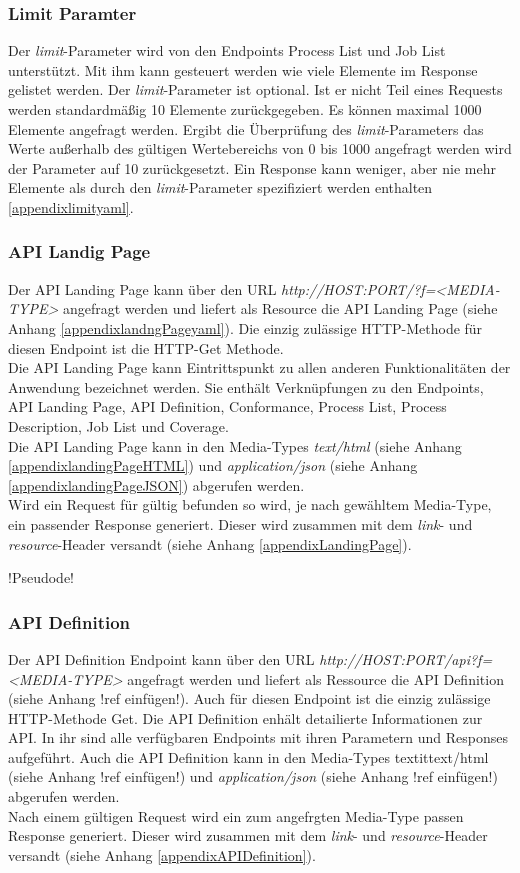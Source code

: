 \subsubsection{Limit Paramter}
Der \textit{limit}-Parameter wird von den Endpoints Process List und Job List unterstützt. Mit ihm kann gesteuert werden wie viele Elemente im Response gelistet werden. 
Der \textit{limit}-Parameter ist optional. Ist er nicht Teil eines Requests werden standardmäßig 10 Elemente zurückgegeben. Es können maximal 1000 Elemente angefragt werden.
Ergibt die Überprüfung des \textit{limit}-Parameters das Werte außerhalb des gültigen Wertebereichs von 0 bis 1000 angefragt werden wird der Parameter auf 10 zurückgesetzt. 
Ein Response kann weniger, aber nie mehr Elemente als durch den \textit{limit}-Parameter spezifiziert werden enthalten \ref{appendixlimityaml}. 

\subsubsection{API Landig Page}
Der API Landing Page kann über den URL \textit{http://HOST:PORT/?f=<MEDIA-TYPE>} angefragt werden und liefert als Resource die 
API Landing Page (siehe Anhang \ref{appendixlandngPageyaml}). 
Die einzig zulässige HTTP-Methode für diesen Endpoint ist die HTTP-Get Methode.\\ 
Die API Landing Page kann Eintrittspunkt zu allen anderen Funktionalitäten der Anwendung bezeichnet werden. Sie enthält Verknüpfungen zu den Endpoints, API Landing Page, API Definition, 
Conformance, Process List, Process Description, Job List und Coverage.\\
Die API Landing Page kann in den Media-Types \textit{text/html} (siehe Anhang \ref{appendixlandingPageHTML}) und \textit{application/json} 
(siehe Anhang \ref{appendixlandingPageJSON}) abgerufen werden.\\
 
Wird ein Request für gültig befunden so wird, je nach gewähltem Media-Type, ein passender Response generiert. 
Dieser wird zusammen mit dem \textit{link}- und \textit{resource}-Header versandt (siehe Anhang \ref{appendixLandingPage}). 

!Pseudode!

\subsubsection{API Definition}
Der API Definition Endpoint kann über den URL \textit{http://HOST:PORT/api?f=<MEDIA-TYPE>} angefragt werden und liefert als Ressource die API Definition (siehe Anhang !ref einfügen!).
Auch für diesen Endpoint ist die einzig zulässige HTTP-Methode Get. 
Die API Definition enhält detailierte Informationen zur API. In ihr sind alle verfügbaren Endpoints mit ihren Parametern und Responses aufgeführt. Auch die API Definition kann in den Media-Types
textit{text/html} (siehe Anhang !ref einfügen!) und \textit{application/json} (siehe Anhang !ref einfügen!) abgerufen werden.\\
Nach einem gültigen Request wird ein zum angefrgten Media-Type passen Response generiert. Dieser wird zusammen mit dem \textit{link}- und \textit{resource}-Header versandt (siehe Anhang \ref{appendixAPIDefinition}). 


